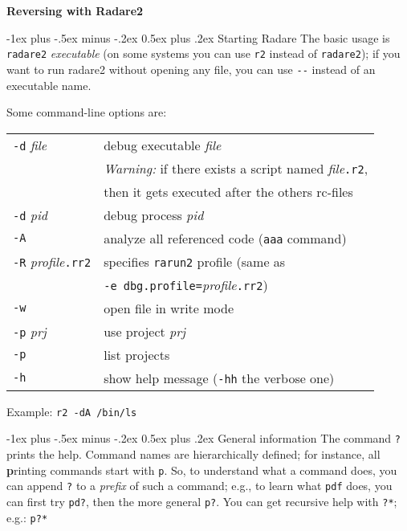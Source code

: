 \documentclass[a4paper,landscape]{article}
\makeatletter
\renewcommand{\section}{\@startsection{section}{1}{0mm}%
                                {-1ex plus -.5ex minus -.2ex}%
                                {0.5ex plus .2ex}%
                                {\normalfont\large\bfseries}}
\makeatother
\begin{document}
\footnotesize
\begin{multicols*}{3}
\setlength{\premulticols}{1pt}
\setlength{\postmulticols}{1pt}
\setlength{\multicolsep}{1pt}
\setlength{\columnsep}{2pt}

\begin{center}
     \Large{\textbf{Reversing with Radare2}} \\
\end{center}

\section{Starting Radare}
The basic usage is \texttt{radare2} \textit{executable} (on some systems you can
use \texttt{r2} instead of \texttt{radare2}); if you want to run radare2 without
opening any file, you can use \texttt{-{}-} instead of an executable name.

Some command-line options are:

\begin{tabular}{@{}ll@{}}
\texttt{-d} \textit{file} & debug executable \textit{file} \\
	& \emph{Warning:} if there exists a script named \textit{file}\texttt{.r2}, \\
	& then it gets executed after the others rc-files \\
\texttt{-d} \textit{pid} & debug process \textit{pid} \\
\texttt{-A}	& analyze all referenced code (\texttt{aaa} command) \\
\texttt{-R} \textit{profile}\texttt{.rr2} & specifies \texttt{rarun2} profile (same as \\ & \texttt{-e dbg.profile=}\textit{profile}\texttt{.rr2}) \\
\texttt{-w}	& open file in write mode \\
\texttt{-p} \textit{prj} & use project \textit{prj} \\
\texttt{-p} & list projects \\
\texttt{-h} & show help message (\texttt{-hh} the verbose one)
\end{tabular}

Example: \texttt{r2 -dA /bin/ls}

\section{General information}
The command \texttt{?} prints the help. Command names are hierarchically defined; for instance, all \textbf{p}rinting commands start with \texttt{p}. So, to understand what a command does, you can append \texttt{?} to a \emph{prefix} of such a command; e.g., to learn what \texttt{pdf} does, you can first try \texttt{pd?}, then the more general \texttt{p?}.
You can get recursive help with \texttt{?*}; e.g.: \texttt{p?*}


\end{multicols*}
\end{document}
